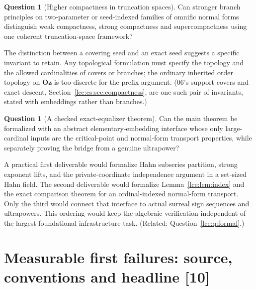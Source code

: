 \documentclass[11pt,letterpaper]{article}
\numberwithin{equation}{section}
\theoremstyle{definition}
\newtheorem{question}[theorem]{Question}
\theoremstyle{remark}
\newcommand{\Oz}{\mathbf{Oz}}
\newcommand{\leref}[1]{Lemma~\ref{#1}}
\newcommand{\src}[1]{\textup{\textsf{\small[#1]}}}%
\begin{document}
\begin{question}[Higher compactness in truncation spaces]\label{lce:sg:q:compactness}
Can stronger branch principles on two-parameter or seed-indexed families of
omnific normal forms distinguish weak compactness, strong compactness and
supercompactness using one coherent truncation-space framework?
\end{question}
The distinction between a covering seed and an exact seed suggests a
specific invariant to retain. Any topological formulation must specify the
topology and the allowed cardinalities of covers or branches; the ordinary
inherited order topology on $\Oz$ is too discrete for the prefix argument.
(06's support covers and exact descent, Section~\ref{lce:cs:sec:compactness},
are one such pair of invariants, stated with embeddings rather than
branches.)

\begin{question}[A checked exact-equalizer theorem]\label{lce:sg:q:formal}
Can the main theorem be formalized with an abstract elementary-embedding
interface whose only large-cardinal inputs are the critical-point and
normal-form transport properties, while separately proving the bridge from a
genuine ultrapower?
\end{question}
A practical first deliverable would formalize Hahn subseries partition,
strong exponent lifts, and the private-coordinate independence argument in a
set-sized Hahn field. The second deliverable would formalize
\leref{lce:lem:index} and the exact comparison theorem for an
ordinal-indexed normal-form transport. Only the third would connect that
interface to actual surreal sign sequences and ultrapowers. This ordering
would keep the algebraic verification independent of the largest
foundational infrastructure task. (Related: Question~\ref{lce:q:formal}.)

\section{Measurable first failures: source, conventions and headline \src{10}}
\label{lce:mf:sec:intro}
\end{document}
